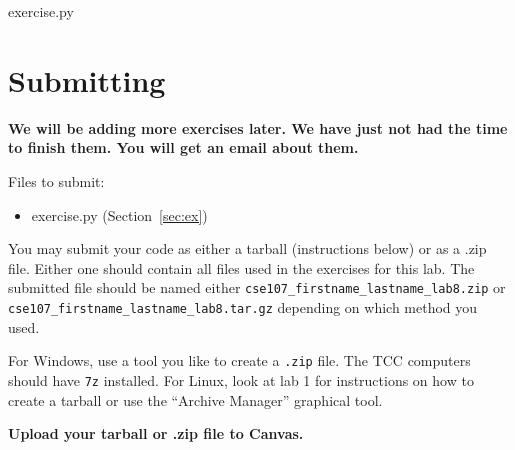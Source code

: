 \documentclass[11pt]{cselabheader}
\begin{document}
\begin{description}
  \item[exercise.py]
\end{description}

\pagebreak
\section{Submitting}

\begin{center}
  \textbf{We will be adding more exercises later. We have just not had the time
  to finish them. You will get an email about them.}
\end{center}

Files to submit:
\begin{itemize}
  \item exercise.py (Section~\ref{sec:ex})
\end{itemize}

You may submit your code as either a tarball (instructions below) or as a .zip
file. Either one should contain all files used in the exercises for this lab.
The submitted file should be named either
\texttt{cse107\_firstname\_lastname\_lab8.zip} or
\texttt{cse107\_firstname\_lastname\_lab8.tar.gz} depending on which method you
used.

For Windows, use a tool you like to create a \texttt{.zip} file. The TCC
computers should have \texttt{7z} installed. For Linux, look at lab 1 for
instructions on how to create a tarball or use the ``Archive Manager'' graphical
tool.

\begin{center}
  \textbf{Upload your tarball or .zip file to Canvas.}
\end{center}
\end{document}
